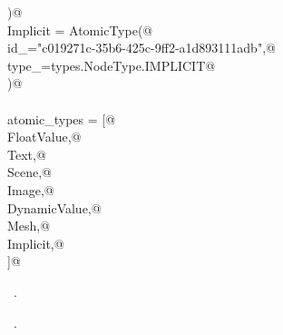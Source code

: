 \documentclass[
    a4paper,      %
    10pt,         %
    openright,    %
    notitlepage,  %
    parskip=half, %
]{scrreprt}       %
\theoremstyle{definition}                    %
\begin{document}
\begin{flushleft}
\begin{minipage}{\linewidth}
\begin{list}{}{}
\mbox{}\lstinline@    )@\\
\mbox{}\lstinline@    Implicit = AtomicType(@\\
\mbox{}\lstinline@        id_="c019271c-35b6-425c-9ff2-a1d893111adb",@\\
\mbox{}\lstinline@        type_=types.NodeType.IMPLICIT@\\
\mbox{}\lstinline@    )@\\
\mbox{}\lstinline@@\\
\mbox{}\lstinline@    atomic_types = [@\\
\mbox{}\lstinline@        FloatValue,@\\
\mbox{}\lstinline@        Text,@\\
\mbox{}\lstinline@        Scene,@\\
\mbox{}\lstinline@        Image,@\\
\mbox{}\lstinline@        DynamicValue,@\\
\mbox{}\lstinline@        Mesh,@\\
\mbox{}\lstinline@        Implicit,@\\
\mbox{}\lstinline@    ]@\\
\mbox{}\lstinline@@{\NWsep}
\end{list}
\vspace{-1.5ex}
\footnotesize
\begin{list}{}{\setlength{\itemsep}{-\parsep}\setlength{\itemindent}{-\leftmargin}}
\item \NWtxtMacroDefBy\ .
\item \NWtxtMacroRefIn\ .

\item{}
\end{list}
\end{minipage}\vspace{4ex}
\end{flushleft}
\end{document}
